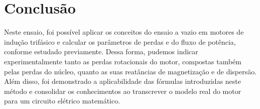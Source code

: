 \documentclass[a4paper,12pt,oneside]{article}
\begin{document}
\newpage
\section{Conclusão}\hspace{0cm}

Neste ensaio, foi possível aplicar os conceitos do ensaio a vazio em motores de indução trifásico e calcular os parâmetros de perdas e do fluxo de potência, conforme estudado previamente. Dessa forma, pudemos indicar experimentalmente tanto as perdas rotacionais do motor, compostas também pelas perdas do núcleo, quanto as suas reatâncias de magnetização e de dispersão. Além disso, foi demonstrado a aplicabilidade das fórmulas introduzidas neste método e consolidar os conhecimentos ao transcrever o modelo real do motor para um circuito elétrico matemático.




\newpage
{}


\end{document}
